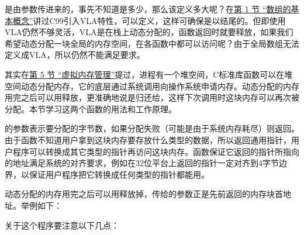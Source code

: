 

是由参数传进来的，事先不知道是多少，那么该定义多大呢？在\hyperlink{db.ch08s01.id2733213}{第 1 节 “数组的基本概念”}讲过C99引入VLA特性，可以定义，这样可确保是以结尾的。但即使用VLA仍然不够灵活，VLA是在栈上动态分配的，函数返回时就要释放，如果我们希望动态分配一块全局的内存空间，在各函数中都可以访问呢？由于全局数组无法定义成VLA，所以仍然不能满足要求。



其实在\hyperlink{db.ch20s05.id2791323}{第 5 节 “虚拟内存管理”}提过，进程有一个堆空间，C标准库函数可以在堆空间动态分配内存，它的底层通过系统调用向操作系统申请内存。动态分配的内存用完之后可以用释放，更准确地说是归还给，这样下次调用时这块内存可以再次被分配。本节学习这两个函数的用法和工作原理。




的参数表示要分配的字节数，如果分配失败（可能是由于系统内存耗尽）则返回。由于函数不知道用户拿到这块内存要存放什么类型的数据，所以返回通用指针，用户程序可以转换成其它类型的指针再访问这块内存。函数保证它返回的指针所指向的地址满足系统的对齐要求，例如在32位平台上返回的指针一定对齐到4字节边界，以保证用户程序把它转换成任何类型的指针都能用。



动态分配的内存用完之后可以用释放掉，传给的参数正是先前返回的内存块首地址。举例如下：





关于这个程序要注意以下几点：


